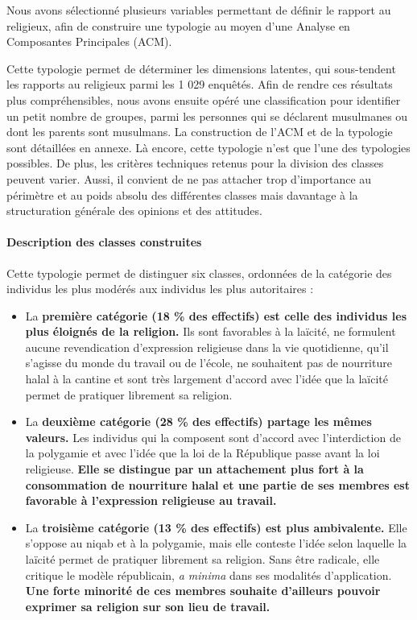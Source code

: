 Nous avons sélectionné plusieurs variables permettant de définir le
rapport au religieux, afin de construire une typologie au moyen d'une
Analyse en Composantes Principales (ACM).

Cette typologie permet de déterminer les dimensions latentes, qui
sous-tendent les rapports au religieux parmi les 1 029 enquêtés. Afin de
rendre ces résultats plus compréhensibles, nous avons ensuite opéré une
classification pour identifier un petit nombre de groupes, parmi les
personnes qui se déclarent musulmanes ou dont les parents sont
musulmans. La construction de l'ACM et de la typologie sont détaillées
en annexe. Là encore, cette typologie n'est que l'une des typologies
possibles. De plus, les critères techniques retenus pour la division des
classes peuvent varier. Aussi, il convient de ne pas attacher trop
d'importance au périmètre et au poids absolu des différentes classes
mais davantage à la structuration générale des opinions et des
attitudes.


\paragraph{Description des classes construites}


Cette typologie permet de distinguer six classes, ordonnées de la
catégorie des individus les plus modérés aux individus les plus
autoritaires :


\begin{itemize}
\item
  La \textbf{première catégorie (18 \% des effectifs) est celle des
  individus les plus éloignés de la religion.} Ils sont favorables à la
  laïcité, ne formulent aucune revendication d'expression religieuse
  dans la vie quotidienne, qu'il s'agisse du monde du travail ou de
  l'école, ne souhaitent pas de nourriture halal à la cantine et sont
  très largement d'accord avec l'idée que la laïcité permet de pratiquer
  librement sa religion.
\item
  La \textbf{deuxième catégorie (28 \% des effectifs) partage les mêmes
  valeurs.} Les individus qui la composent sont d'accord avec
  l'interdiction de la polygamie et avec l'idée que la loi de la
  République passe avant la loi religieuse. \textbf{Elle se distingue
  par un attachement plus fort à la consommation de nourriture halal et
  une partie de ses membres est favorable à l'expression religieuse au
  travail.}
\item
  La \textbf{troisième catégorie (13 \% des effectifs) est plus
  ambivalente.} Elle s'oppose au niqab et à la polygamie, mais elle
  conteste l'idée selon laquelle la laïcité permet de pratiquer
  librement sa religion. Sans être radicale, elle critique le modèle
  républicain, \emph{a minima} dans ses modalités d'application.
  \textbf{Une forte minorité de ces membres souhaite d'ailleurs pouvoir
  exprimer sa religion sur son lieu de travail.}
\end{itemize}



